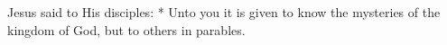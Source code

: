 Jesus said to His disciples: * Unto you it is given to know the mysteries of the kingdom of God, but to others in parables.